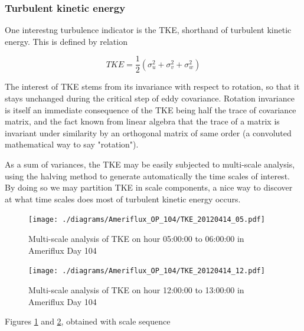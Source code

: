 \documentclass[a4paper,10pt]{book}
\begin{document}
\subsubsection{Turbulent kinetic energy}

One interestng turbulence indicator is the TKE, shorthand of turbulent kinetic energy. This is defined by relation

\begin{equation}
	TKE = \frac{1}{2} \left(
		\sigma_{u}^{2} + \sigma_{v}^{2} + \sigma_{w}^{2}
	\right)
\end{equation}

The interest of TKE stems from its invariance with respect to rotation, so that it stays unchanged during the critical step of eddy covariance. Rotation invariance is itself an immediate consequence of the TKE being half the trace of covariance matrix, and the fact known from linear algebra that the trace of a matrix is invariant under similarity by an orthogonal matrix of same order (a convoluted mathematical way to say "rotation").

As a sum of variances, the TKE may be easily subjected to multi-scale analysis, using the halving method to generate automatically the time scales of interest. By doing so we may partition TKE in scale components, a nice way to discover at what time scales does most of turbulent kinetic energy occurs.

\begin{figure}[htp]
 \centering
 \begin{center}
 \texttt{[image: ./diagrams/Ameriflux\_OP\_104/TKE\_20120414\_05.pdf]}
 \end{center}
 \caption{Multi-scale analysis of TKE on hour 05:00:00 to 06:00:00 in Ameriflux Day 104}
 \label{fig:Ame.104.TKE.Stable}
\end{figure}

\begin{figure}[htp]
 \centering
 \begin{center}
 \texttt{[image: ./diagrams/Ameriflux\_OP\_104/TKE\_20120414\_12.pdf]}
 \end{center}
 \caption{Multi-scale analysis of TKE on hour 12:00:00 to 13:00:00 in Ameriflux Day 104}
 \label{fig:Ame.104.TKE.Convective}
\end{figure}

Figures \ref{fig:Ame.104.TKE.Stable} and \ref{fig:Ame.104.TKE.Convective}, obtained with scale sequence
\end{document}
